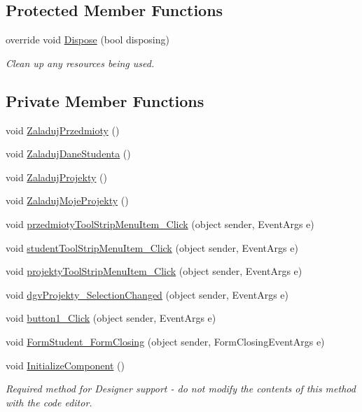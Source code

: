 \subsection*{Protected Member Functions}
\begin{DoxyCompactItemize}
\item 
override void \hyperlink{class_dziennik_ocen_1_1_form_student_a2b1c3e297618729ddc9b97963d9bddda}{Dispose} (bool disposing)
\begin{DoxyCompactList}\small\item\em Clean up any resources being used. \end{DoxyCompactList}\end{DoxyCompactItemize}
\subsection*{Private Member Functions}
\begin{DoxyCompactItemize}
\item 
void \hyperlink{class_dziennik_ocen_1_1_form_student_a610e562e883311501715fb9066284c98}{Zaladuj\+Przedmioty} ()
\item 
void \hyperlink{class_dziennik_ocen_1_1_form_student_a533c3fec9f9f828b13c367ec9f3704b4}{Zaladuj\+Dane\+Studenta} ()
\item 
void \hyperlink{class_dziennik_ocen_1_1_form_student_adde6792fcf3f864c856ccd7bca293add}{Zaladuj\+Projekty} ()
\item 
void \hyperlink{class_dziennik_ocen_1_1_form_student_af8be97cad78cc0a85ea9528f5e8cc312}{Zaladuj\+Moje\+Projekty} ()
\item 
void \hyperlink{class_dziennik_ocen_1_1_form_student_a867ea1d076f7fd4dc7bfa6f3b870b52d}{przedmioty\+Tool\+Strip\+Menu\+Item\+\_\+\+Click} (object sender, Event\+Args e)
\item 
void \hyperlink{class_dziennik_ocen_1_1_form_student_aeec318394ab1b1e00a8f0d6ab5d15e3a}{student\+Tool\+Strip\+Menu\+Item\+\_\+\+Click} (object sender, Event\+Args e)
\item 
void \hyperlink{class_dziennik_ocen_1_1_form_student_af5850ddba074f1119817ad279db6b326}{projekty\+Tool\+Strip\+Menu\+Item\+\_\+\+Click} (object sender, Event\+Args e)
\item 
void \hyperlink{class_dziennik_ocen_1_1_form_student_a7c84c02d2fb4636dece7caf2c88a4d13}{dgv\+Projekty\+\_\+\+Selection\+Changed} (object sender, Event\+Args e)
\item 
void \hyperlink{class_dziennik_ocen_1_1_form_student_ae74000b681a9c5958ab1369820a6bf4c}{button1\+\_\+\+Click} (object sender, Event\+Args e)
\item 
void \hyperlink{class_dziennik_ocen_1_1_form_student_af42ad894b5a65d57d81bcf90ac1568dd}{Form\+Student\+\_\+\+Form\+Closing} (object sender, Form\+Closing\+Event\+Args e)
\item 
void \hyperlink{class_dziennik_ocen_1_1_form_student_a52bcdd2774ac5ad7145ad5602d923ad1}{Initialize\+Component} ()
\begin{DoxyCompactList}\small\item\em Required method for Designer support -\/ do not modify the contents of this method with the code editor. \end{DoxyCompactList}\end{DoxyCompactItemize}
